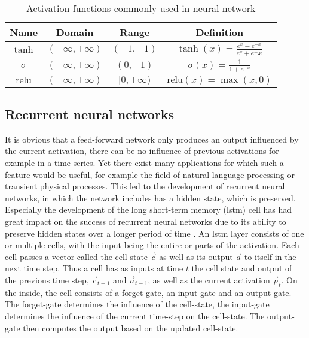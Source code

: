 \begin{table}
	\centering
	\caption{Activation functions commonly used in neural network}
	\begin{tabular}{c|c|c|c}
		\hline \hline
		Name & Domain & Range & Definition \\
		\hline
		$\tanh$ & $ (-\infty, + \infty)$ & $(-1, -1)$ & $\tanh(x) = \frac{e^x - e^{-x}}{e^x + e^-x}$ \\
		\hline
		$\sigma$ & $(-\infty, + \infty)$ & $(0, -1 )$ & $\sigma(x) = \frac{1}{1 + e^{-x}} $ \\ \hline
		$\mathrm{relu}$ & $(-\infty, + \infty)$ & $[0, +\infty)$  & $\mathrm{relu}(x) = \max(x,0)$ \\\hline \hline
	\end{tabular}\label{tab:activations}
\end{table}
\subsection{Recurrent neural networks}
It is obvious that a feed-forward network only produces an output influenced by the current activation, there can be no influence of previous activations for example in a time-series. Yet there exist many applications for which such a feature would be useful, for example the field of natural language processing \cite{ghosh_contextual_2016} or transient physical processes. This led to the development of recurrent neural networks, in which the network includes has a hidden state, which is preserved. Especially the development of the long short-term memory (lstm)  cell has had great impact on the success of recurrent neural networks due to its ability to preserve hidden states over a longer period of time \cite{hochreiter_long_1997}. An lstm layer consists of one or multiple cells, with the input being the entire or parts of the activation. Each cell passes a vector called the cell state $\vec{c}$ as well as its output $\vec{a}$ to itself in the next time step. Thus a cell has as inputs at time $t$ the cell state and output of the previous time step, $\vec{c}_{t-1}$ and $\vec{a}_{t-1}$, as well as the current activation $\vec{p}_t$. On the inside, the cell consists of a forget-gate, an input-gate and an output-gate. The forget-gate determines the influence of the cell-state, the input-gate determines the influence of the current time-step on the cell-state. The output-gate then computes the output based on the updated cell-state.
\begin{figure}
	\centering
	\def\svgwidth{0.5 \textwidth}
	
\end{figure} 

